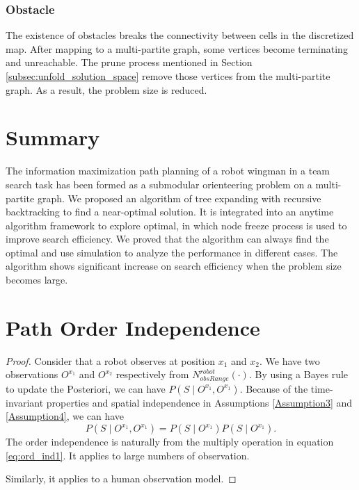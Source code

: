 \documentclass[12pt]{article}
\begin{document}
\subsubsection{Obstacle}
\label{subsubsec:obstacle}

The existence of obstacles breaks the connectivity between cells in the discretized map.
After mapping to a multi-partite graph, some vertices become terminating and unreachable.
The prune process mentioned in Section \ref{subsec:unfold_solution_space} remove those vertices from the multi-partite graph.
As a result, the problem size is reduced.

\section{Summary}
\label{sec:summary}

The information maximization path planning of a robot wingman in a team search task has been formed as a submodular orienteering problem on a multi-partite graph.
We proposed an algorithm of tree expanding with recursive backtracking to find a near-optimal solution. 
It is integrated into an anytime algorithm framework to explore optimal, in which node freeze process is used to improve search efficiency.
We proved that the algorithm can always find the optimal and use simulation to analyze the performance in different cases.
The algorithm shows significant increase on search efficiency when the problem size becomes large.





\appendix

\section{Path Order Independence}
\label{app:order_independence}
\begin{proof}

Consider that a robot observes at position $ x_{1} $ and $ x_{2} $.
We have two observations $ O^{x_{1}} $ and $ O^{x_{2}} $ respectively from $ N^{robot}_{obsRange}( \cdot ) $.
By using a Bayes rule to update the Posteriori, we can have $ P(S \mid O^{x_{1}} , O^{x_{1}} ) $.
Because of the time-invariant properties and spatial independence in Assumptions \ref{Assumption3} and \ref{Assumption4}, we can have
\begin{equation}
\label{eq:ord_ind1}
P(S \mid O^{x_{1}} , O^{x_{1}} ) = P(S \mid O^{x_{1}} ) P(S \mid O^{x_{1}} ).
\end{equation}
The order independence is naturally from the multiply operation in equation \eqref{eq:ord_ind1}.
It applies to large numbers of observation.

Similarly, it applies to a human observation model.
\end{proof}
\end{document}
